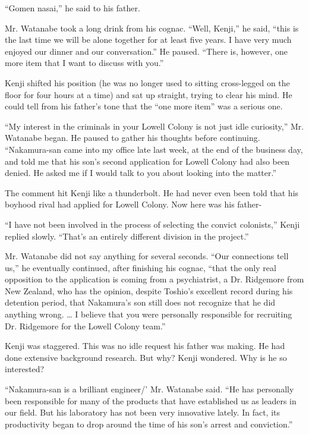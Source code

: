 \documentclass[]{article}
\begin{document}
{“Gomen nasai,” he said to his father.

Mr. Watanabe took a long drink from his cognac. “Well, Kenji,” he said, “this is the last time we will be alone together for at least five years. I have very much enjoyed our dinner and our conversation.” He paused. “There is, however, one more item that I want to discuss with you.”

Kenji shifted his position (he was no longer used to sitting cross-legged on the floor for four hours at a time) and sat up straight, trying to clear his mind. He could tell from his father’s tone that the “one more item” was a serious one.

“My interest in the criminals in your Lowell Colony is not just idle curiosity,” Mr. Watanabe began. He paused to gather his thoughts before continuing. “Nakamura-san came into my office late last week, at the end of the business day, and told me that his son’s second application for Lowell Colony had also been denied. He asked me if I would talk to you about looking into the matter.”

The comment hit Kenji like a thunderbolt. He had never even been told that his boyhood rival had applied for Lowell Colony. Now here was his father-

“I have not been involved in the process of selecting the convict colonists,” Kenji replied slowly. “That’s an entirely different division in the project.”

Mr. Watanabe did not say anything for several seconds. “Our connections tell us,” he eventually continued, after finishing his cognac, “that the only real opposition to the application is coming from a psychiatrist, a Dr. Ridgemore from New Zealand, who has the opinion, despite Toshio’s excellent record during his detention period, that Nakamura’s son still does not recognize that he did anything wrong. … I believe that you were personally responsible for recruiting Dr. Ridgemore for the Lowell Colony team.”

Kenji was staggered. This was no idle request his father was making. He had done extensive background research. But why? Kenji wondered. Why is he so interested?

“Nakamura-san is a brilliant engineer/’ Mr. Watanabe said. “He has personally been responsible for many of the products that have established us as leaders in our field. But his laboratory has not been very innovative lately. In fact, its productivity began to drop around the time of his son’s arrest and conviction.”

}
\end{document}
